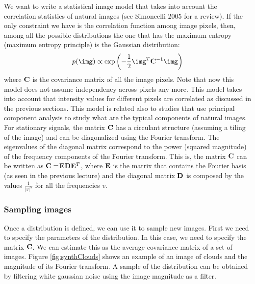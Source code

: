 We want to write a statistical image model that takes into account the correlation statistics of natural images (see Simoncelli 2005 for a review). If the only constraint we have is the correlation function among image pixels, then, among all the possible distributions the one that has the maximum entropy (maximum entropy principle) is the Gaussian distribution:
\begin{equation}
  p(\img) \propto \exp \left(-\frac{1}{2} \img^T {\bf C}^{-1} \img \right)
  \label{eq:gaussianmodel}
\end{equation}
where ${\bf C}$ is the covariance matrix of all the image pixels. Note that now this model does not assume independency across pixels any more. This model takes into account that intensity values for different pixels are correlated as discussed in the previous sections. This model is related also to studies that use principal component analysis to study what are the typical components of natural images. For stationary signals, the matrix ${\bf C}$ has a circulant structure (assuming a tiling of the image) and can be diagonalized using the Fourier transform. The eigenvalues of the diagonal matrix correspond to the power (squared magnitude) of the frequency components of the Fourier transform. This is, the matrix ${\bf C}$ can be written as ${\bf C} = ${\bf E}{\bf D}${\bf E}^T$, where ${\bf E}$ is the matrix that contains the Fourier basis (as seen in the previous lecture) and the diagonal matrix ${\bf D}$ is composed by the values $\frac{1}{| v | ^ \alpha}$ for all the frequencies $v$.


%


\subsubsection{Sampling images}

Once a distribution is defined, we can use it to sample new images. First we need to specify the parameters of the distribution. In this case, we need to specify the matrix ${\bf C}$. We can estimate this as the average covariance matrix of a set of images. Figure \ref{fig:synthClouds} shows an example of an image of clouds and the magnitude of its Fourier transform. A sample of the distribution can be obtained by filtering white gaussian noise using the image magnitude as a filter.

